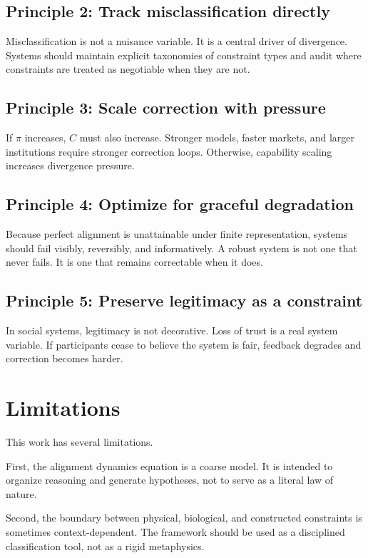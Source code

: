 \documentclass[11pt]{article}
\begin{document}
\subsection{Principle 2: Track misclassification directly}

Misclassification is not a nuisance variable. It is a central driver of divergence. Systems should maintain explicit taxonomies of constraint types and audit where constraints are treated as negotiable when they are not.

\subsection{Principle 3: Scale correction with pressure}

If \(\pi\) increases, \(C\) must also increase. Stronger models, faster markets, and larger institutions require stronger correction loops. Otherwise, capability scaling increases divergence pressure.

\subsection{Principle 4: Optimize for graceful degradation}

Because perfect alignment is unattainable under finite representation, systems should fail visibly, reversibly, and informatively. A robust system is not one that never fails. It is one that remains correctable when it does.

\subsection{Principle 5: Preserve legitimacy as a constraint}

In social systems, legitimacy is not decorative. Loss of trust is a real system variable. If participants cease to believe the system is fair, feedback degrades and correction becomes harder.

\section{Limitations}

This work has several limitations.

First, the alignment dynamics equation is a coarse model. It is intended to organize reasoning and generate hypotheses, not to serve as a literal law of nature.

Second, the boundary between physical, biological, and constructed constraints is sometimes context-dependent. The framework should be used as a disciplined classification tool, not as a rigid metaphysics.
\end{document}
